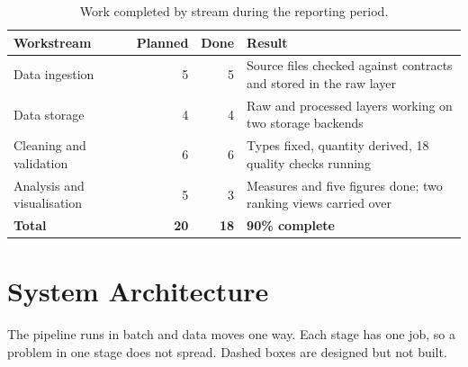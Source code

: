 \documentclass[11pt,a4paper]{article}
\begin{document}
\begin{table}[h]
\centering\small
\begin{tabular}{@{}lrrp{7.2cm}@{}}
\toprule
\textbf{Workstream} & \textbf{Planned} & \textbf{Done} & \textbf{Result} \\
\midrule
Data ingestion & 5 & 5 & Source files checked against contracts and stored in the raw layer \\
Data storage & 4 & 4 & Raw and processed layers working on two storage backends \\
Cleaning and validation & 6 & 6 & Types fixed, quantity derived, 18 quality checks running \\
Analysis and visualisation & 5 & 3 & Measures and five figures done; two ranking views carried over \\
\midrule
\textbf{Total} & \textbf{20} & \textbf{18} & \textbf{90\% complete} \\
\bottomrule
\end{tabular}
\caption{Work completed by stream during the reporting period.}
\end{table}

\section{System Architecture}
The pipeline runs in batch and data moves one way. Each stage has one job, so a problem in one
stage does not spread. Dashed boxes are designed but not built.
\end{document}

